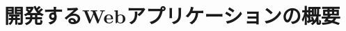 \documentclass[main]{subfiles}
\begin{document}
\chapter{開発するWebアプリケーションの概要}
\label{cha:application_overview}
\end{document}
